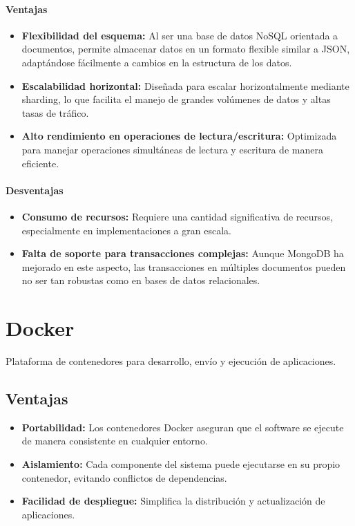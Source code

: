 \paragraph{Ventajas}
\begin{itemize}
    \item \textbf{Flexibilidad del esquema:} Al ser una base de datos NoSQL orientada a documentos, permite almacenar datos en un formato flexible similar a JSON, adaptándose fácilmente a cambios en la estructura de los datos.
    
    \item \textbf{Escalabilidad horizontal:} Diseñada para escalar horizontalmente mediante sharding, lo que facilita el manejo de grandes volúmenes de datos y altas tasas de tráfico.
    
    \item \textbf{Alto rendimiento en operaciones de lectura/escritura:} Optimizada para manejar operaciones simultáneas de lectura y escritura de manera eficiente.
\end{itemize}

\paragraph{Desventajas}
\begin{itemize}
    \item \textbf{Consumo de recursos:} Requiere una cantidad significativa de recursos, especialmente en implementaciones a gran escala.
    
    \item \textbf{Falta de soporte para transacciones complejas:} Aunque MongoDB ha mejorado en este aspecto, las transacciones en múltiples documentos pueden no ser tan robustas como en bases de datos relacionales.
\end{itemize}

\clearpage
\section{Docker}
Plataforma de contenedores para desarrollo, envío y ejecución de aplicaciones.

\subsection{Ventajas}
\begin{itemize}
    \item \textbf{Portabilidad:} Los contenedores Docker aseguran que el software se ejecute de manera consistente en cualquier entorno.
    
    \item \textbf{Aislamiento:} Cada componente del sistema puede ejecutarse en su propio contenedor, evitando conflictos de dependencias.
    
    \item \textbf{Facilidad de despliegue:} Simplifica la distribución y actualización de aplicaciones.
\end{itemize}

